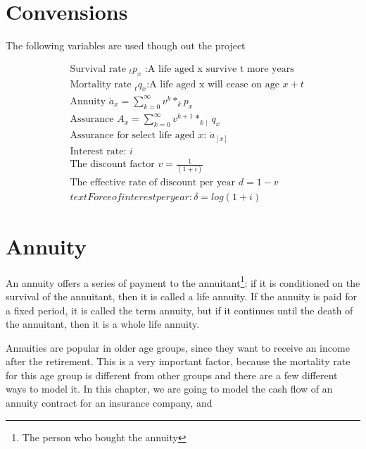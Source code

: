 \documentclass{report}
\begin{document}
\chapter*{Convensions}



The following variables are used though out the project

\begin{align*}
&\text{Survival rate }_t p_x \text{ :A life aged x survive t more years}\\
&\text{Mortality rate } _t q_x \text{:A life aged x will cease on age $x+t$}\\
&\text{Annuity  }\ddot{a}_x = \sum_{k=0}^{\infty} v^k*_kp_x\\
&\text{Assurance  }A_x = \sum_{k=0}^{\infty} v^{k+1}*_{k\mid} q_x\\
&\text{Assurance for select life aged $x$: }\ddot{a}_{[x]}\\
&\text{Interest rate: } i\\
&\text{The discount factor } v = \frac{1}{(1+i)} \\
&\text{The effective rate of discount per year } d =1-v\\
&text{Force of interest per year:} \delta =log(1+i)
\end{align*}





\chapter{Annuity}    \label{annuity}

An annuity offers a series of payment to the annuitant\footnote{The person who bought the annuity}; if it is conditioned on the survival of the annuitant, then it is called a life annuity. If the annuity is paid for a fixed period, it is called the term annuity, but if it continues until the death of the annuitant, then it is a whole life annuity.


Annuities are popular in older age groups, since they want to receive an income after the retirement. This is a very important factor, because the mortality rate for this age group is different from other groups and there are a few different ways to model it. In this chapter, we are going to model the cash flow of an annuity contract for an insurance company, and 
\end{document}
